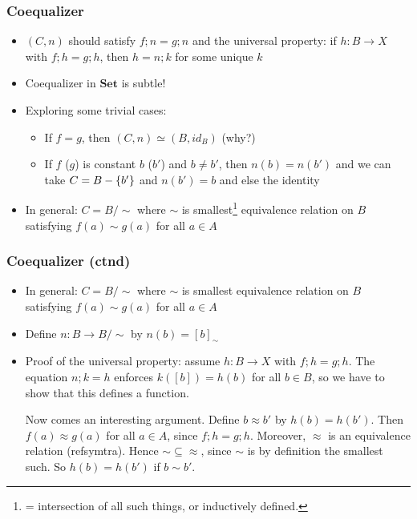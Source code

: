 \documentclass[handout]{beamer}
\newcommand{\bfsf}[1]{{\boldsymbol{#1}}}
\newcommand{\Set}{\bfsf{Set}}
\begin{document}
\frame
  {   
    \frametitle{Coequalizer}\label{Ch4:CoEqSet}

 \begin{itemize}[<+->]
\item $(C,n)$ should satisfy $f;n=g;n$ and the universal property:
if $h: B\to X$ with $f;h=g;h$, then $h=n;k$ for some unique $k$
\item Coequalizer in $\Set$ is subtle!
\item Exploring some trivial cases:
 \begin{itemize}
\item If $f=g$, then $(C,n)\simeq(B,id_B)$ (why?)
\item If $f$ ($g$) is constant $b$ ($b'$) and  $b\neq b'$, then $n(b)=n(b')$
and we can take $C = B-\{b'\}$ and $n(b')=b$ and else the identity
\end{itemize}
\item In general: $C=B/{\sim}$ where $\sim$ is smallest\footnote{%
= intersection of all such things, or inductively defined.}
 equivalence relation
 on $B$ satisfying $f(a)\sim g(a)$ for all $a\in A$
\end{itemize}

}

\frame
  {   
    \frametitle{Coequalizer (ctnd)}\label{Ch4:CoEqSetCtnd}

 \begin{itemize}[<+->]
\item In general: $C=B/{\sim}$ where $\sim$ is smallest equivalence relation
 on $B$ satisfying $f(a)\sim g(a)$ for all $a\in A$
\item Define $n: B \to B/{\sim}$ by $n(b)= [b]_{\sim}$
\item Proof of the universal property: assume $h:B\to X$ with $f;h=g;h$.
The equation $n;k = h$ enforces $k([b]) = h(b)$ for all $b\in B$, so we have
to show that this defines a function. 
\vspace*{2mm}

Now comes an interesting argument.
Define $b\approx b'$ by $h(b)=h(b')$.
Then $f(a)\approx g(a)$ for all $a\in A$, since $f;h=g;h$.
Moreover, $\approx$ is an equivalence relation (refsymtra).
Hence ${\sim}\subseteq{\approx}$, since $\sim$ is by definition the smallest such.
So $h(b)=h(b')$ if $b\sim b'$.

\end{itemize}

}
\end{document}
